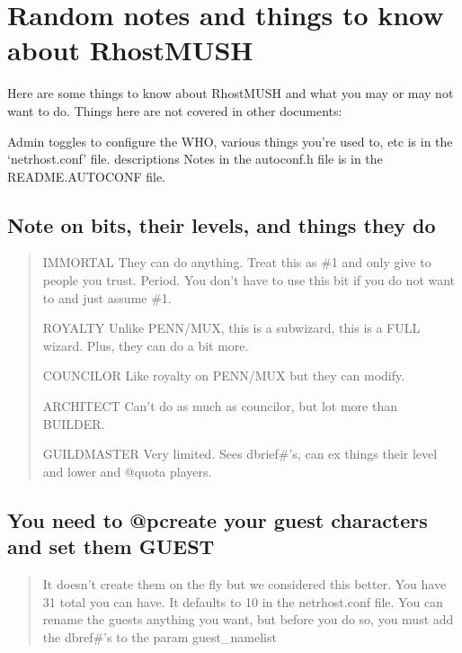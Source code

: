 \documentclass[letterpaper,10pt,english]{sphinxmanual}
\begin{document}
\section{Random notes and things to know about RhostMUSH}
\label{\detokenize{features:random-notes-and-things-to-know-about-rhostmush}}
\sphinxAtStartPar
Here are some things to know about RhostMUSH and what you may or may not
want to do.  Things here are not covered in other documents:

\sphinxAtStartPar
Admin toggles to configure the WHO, various things you’re used to, etc is in the
‘netrhost.conf’ file.  descriptions Notes in the autoconf.h file is in the
README.AUTOCONF file.


\subsection{Note on bits, their levels, and things they do}
\label{\detokenize{features:note-on-bits-their-levels-and-things-they-do}}\begin{quote}

\sphinxAtStartPar
IMMORTAL \sphinxhyphen{} They can do anything.  Treat this as \#1 and only give to
people you trust.  Period.   You don’t have to use this bit
if you do not want to and just assume \#1.

\sphinxAtStartPar
ROYALTY \sphinxhyphen{} Unlike PENN/MUX, this is  a sub\sphinxhyphen{}wizard, this is a
FULL wizard.  Plus, they can do a bit more.

\sphinxAtStartPar
COUNCILOR \sphinxhyphen{} Like royalty on PENN/MUX but they can modify.

\sphinxAtStartPar
ARCHITECT \sphinxhyphen{} Can’t do as much as councilor, but lot more than BUILDER.

\sphinxAtStartPar
GUILDMASTER \sphinxhyphen{} Very limited.  Sees dbrief\#’s, can ex things their
level and lower and @quota players.
\end{quote}


\subsection{You need to @pcreate your guest characters and set them GUEST}
\label{\detokenize{features:you-need-to-pcreate-your-guest-characters-and-set-them-guest}}\begin{quote}

\sphinxAtStartPar
It doesn’t create them on the fly but we considered this better.
You have 31 total you can have.  It defaults to 10 in the
netrhost.conf file.  You can rename the guests anything you want,
but before you do so, you must add the dbref\#’s to the param
guest\_namelist
\end{quote}
\end{document}
